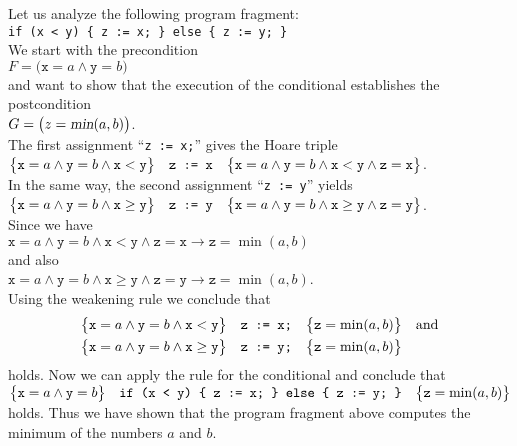 \example
Let us analyze the following program fragment:
\\[0.2cm]
\hspace*{1.3cm}
\texttt{if (x < y) \{ z := x; \} else \{ z := y; \}}
\\[0.2cm]
We start with the precondition
\\[0.2cm]
\hspace*{1.3cm}
$F = \bigl(\texttt{x} = a \wedge \texttt{y} = b\bigr)$
\\[0.2cm]
and want to show that the execution of the conditional establishes the postcondition
\\[0.2cm]
\hspace*{1.3cm}
$G = \bigl(z = \textsl{min}(a, b)\bigr)$.
\\[0.2cm]
The first assignment ``\texttt{z := x;}'' gives the Hoare triple 
\\[0.2cm]
\hspace*{1.3cm}
$\bigl\{\texttt{x} = a \wedge \texttt{y} = b \wedge \texttt{x} < \texttt{y}\bigr\}\quad\texttt{z := x}\quad\bigl\{
          \texttt{x} = a \wedge \texttt{y} = b \wedge \texttt{x} < \texttt{y} \wedge \texttt{z} = \texttt{x}\bigr\}
$.
\\[0.2cm]
In the same way, the second assignment ``\texttt{z := y}'' yields
\\[0.2cm]
\hspace*{1.3cm}
$\bigl\{\texttt{x} = a \wedge \texttt{y} = b \wedge \texttt{x} \geq \texttt{y}\bigr\}\quad\texttt{z := y}\quad\bigl\{
          \texttt{x} = a \wedge \texttt{y} = b \wedge \texttt{x} \geq \texttt{y} \wedge
          \texttt{z} = \texttt{y}\bigr\}$.
\\[0.2cm]
Since we have
\\[0.2cm]
\hspace*{1.3cm}
$\texttt{x} = a \wedge \texttt{y} = b \wedge \texttt{x} < \texttt{y} \wedge \texttt{z} = \texttt{x}
   \rightarrow \texttt{z} = \min(a,b)$
\\[0.2cm]
and also
\\[0.2cm]
\hspace*{1.3cm}
$ \texttt{x} = a \wedge \texttt{y} = b \wedge \texttt{x} \geq \texttt{y} \wedge \texttt{z} = \texttt{y} 
   \rightarrow \texttt{z} = \min(a,b)
$.
\\[0.2cm]
Using the weakening rule we conclude that 
\begin{eqnarray*}
\bigl\{\texttt{x} = a \wedge \texttt{y} = b \wedge \texttt{x} < \texttt{y}\bigr\}\quad\texttt{z := x;}\quad\bigl\{
       \texttt{z} = \min(a,b)\bigr\} & & \mathrm{and} \\
\bigl\{\texttt{x} = a \wedge \texttt{y} = b \wedge \texttt{x} \geq \texttt{y}\bigr\}\quad\texttt{z := y;}\quad\bigl\{
          \texttt{z} = \min(a,b)\bigr\}
\end{eqnarray*}
holds.  Now we can apply the rule for the conditional and conclude
that 
\\[0.2cm]
$ \bigl\{\texttt{x} = a \wedge \texttt{y} = b\bigr\}\quad\texttt{if (x < y) \{ z := x; \} else \{ z := y; \}}\quad\bigl\{ \texttt{z} = \min(a,b)\bigr\} $
\\[0.2cm]
holds.  Thus we have shown that the program fragment above computes
the minimum of the numbers $a$ and $b$.

